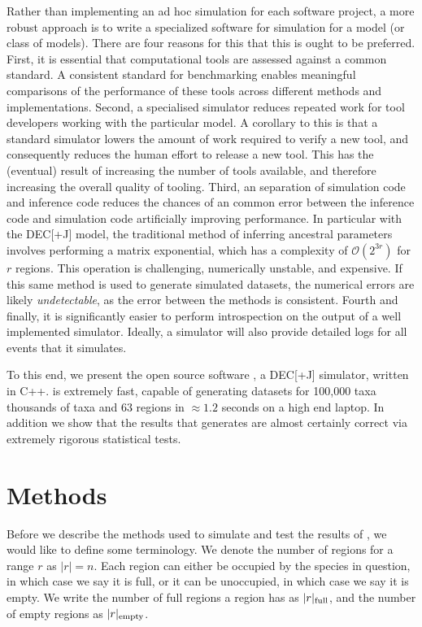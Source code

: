 \documentclass{article}
\begin{document}
Rather than implementing an ad hoc simulation for each software project, a more
robust approach is to write a specialized software for simulation for a model
(or class of models).
There are four reasons for this that this is ought to be preferred.
First, it is essential that computational tools are assessed against a common
standard.
A consistent standard for benchmarking enables meaningful comparisons of the
performance of these tools across different methods and implementations.
Second, a specialised simulator reduces repeated work for tool developers
working with the particular model.
A corollary to this is that a standard simulator lowers the amount of work
required to verify a new tool, and consequently reduces the human effort to
release a new tool.
This has the (eventual) result of increasing the number of tools available, and
therefore increasing the overall quality of tooling.
Third, an separation of simulation code and inference code reduces the chances
of an common error between the inference code and simulation code artificially
improving performance.
In particular with the DEC[+J] model, the traditional method of inferring
ancestral parameters involves performing a matrix exponential, which has a
complexity of $\mathcal{O}(2^{3r})$ for $r$ regions\cite{bettisworth_lagrange-ng_2023}.
This operation is challenging, numerically unstable, and expensive.
If this same method is used to generate simulated datasets, the numerical errors
are likely \textit{undetectable}, as the error between the methods is
consistent.
Fourth and finally, it is significantly easier to perform introspection on the
output of a well implemented simulator.
Ideally, a simulator will also provide detailed logs for all events that it
simulates.

To this end, we present the open source software \bigrig{}, a DEC[+J] simulator,
written in C++.
\bigrig{} is extremely fast, capable of generating datasets for 100,000 taxa
thousands of taxa and 63 regions in $\approx1.2$ seconds on a high end laptop.
In addition we show that the results that \bigrig{} generates are almost
certainly correct via extremely rigorous statistical tests.

\section{Methods}

Before we describe the methods used to simulate and test the results of
\bigrig{}, we would like to define some terminology. We denote the number of
regions for a range \( r \) as \( |r| = n\).
Each region can either be occupied by the species in question, in which case we
say it is full, or it can be unoccupied, in which case we say it is empty.
We write the number of full regions a region has as \( |r|_\text{full} \), and the
number of empty regions as \( |r|_\text{empty} \).
\end{document}
